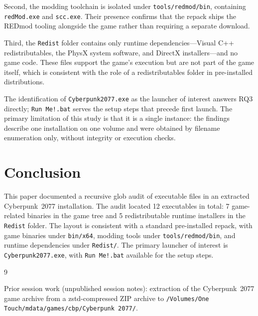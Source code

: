 \documentclass[11pt]{article}
\begin{document}
Second, the modding toolchain is isolated under
\texttt{tools/redmod/bin}, containing \texttt{redMod.exe} and
\texttt{scc.exe}. Their presence confirms that the repack ships the REDmod
tooling alongside the game rather than requiring a separate download.

Third, the \texttt{Redist} folder contains only runtime dependencies---Visual
C++ redistributables, the PhysX system software, and DirectX installers---and
no game code. These files support the game's execution but are not part of the
game itself, which is consistent with the role of a redistributables folder in
pre-installed distributions.

The identification of \texttt{Cyberpunk2077.exe} as the launcher of interest
answers RQ3 directly; \texttt{Run Me!.bat} serves the setup steps that precede
first launch. The primary limitation of this study is that it is a single
instance: the findings describe one installation on one volume and were
obtained by filename enumeration only, without integrity or execution checks.

\section{Conclusion}
\label{sec:conclusion}

This paper documented a recursive glob audit of executable files in an
extracted Cyberpunk~2077 installation. The audit located 12 executables in
total: 7 game-related binaries in the game tree and 5 redistributable runtime
installers in the \texttt{Redist} folder. The layout is consistent with a
standard pre-installed repack, with game binaries under \texttt{bin/x64},
modding tools under \texttt{tools/redmod/bin}, and runtime dependencies under
\texttt{Redist/}. The primary launcher of interest is
\texttt{Cyberpunk2077.exe}, with \texttt{Run Me!.bat} available for the setup
steps.

\begin{thebibliography}{9}

Prior session work (unpublished session notes): extraction of the
Cyberpunk~2077 game archive from a zstd-compressed ZIP archive to
\texttt{/Volumes/One Touch/mdata/games/cbp/Cyberpunk 2077/}.

\end{thebibliography}
\end{document}

